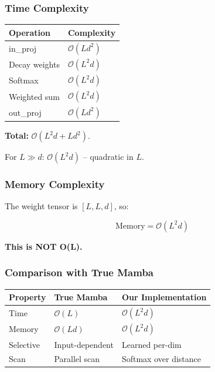 \subsubsection{Time Complexity}

\begin{table}[H]
\centering
\small
\begin{tabular}{ll}
\toprule
\textbf{Operation} & \textbf{Complexity} \\
\midrule
in\_proj & $\mathcal{O}(L d^2)$ \\
Decay weights & $\mathcal{O}(L^2 d)$ \\
Softmax & $\mathcal{O}(L^2 d)$ \\
Weighted sum & $\mathcal{O}(L^2 d)$ \\
out\_proj & $\mathcal{O}(L d^2)$ \\
\bottomrule
\end{tabular}
\end{table}

\textbf{Total:} $\mathcal{O}(L^2 d + L d^2)$.

For $L \gg d$: \textbf{$\mathcal{O}(L^2 d)$} -- quadratic in $L$.

\subsubsection{Memory Complexity}

The weight tensor is $[L, L, d]$, so:

\[
\text{Memory} = \mathcal{O}(L^2 d)
\tag{4.15}
\]

\textbf{This is NOT O(L).}

\subsubsection{Comparison with True Mamba}

\begin{table}[H]
\centering
\small
\begin{tabular}{lll}
\toprule
\textbf{Property} & \textbf{True Mamba} & \textbf{Our Implementation} \\
\midrule
Time & $\mathcal{O}(L)$ & $\mathcal{O}(L^2 d)$ \\
Memory & $\mathcal{O}(L d)$ & $\mathcal{O}(L^2 d)$ \\
Selective & Input-dependent & Learned per-dim \\
Scan & Parallel scan & Softmax over distance \\
\bottomrule
\end{tabular}
\end{table}

